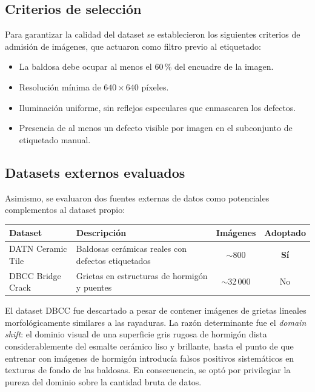 \documentclass[12pt,a4paper]{article}
\begin{document}
\subsection{Criterios de selección}

Para garantizar la calidad del dataset se establecieron los siguientes criterios de
admisión de imágenes, que actuaron como filtro previo al etiquetado:

\begin{itemize}
  \item La baldosa debe ocupar al menos el 60\,\% del encuadre de la imagen.
  \item Resolución mínima de $640\times 640$ píxeles.
  \item Iluminación uniforme, sin reflejos especulares que enmascaren los defectos.
  \item Presencia de al menos un defecto visible por imagen en el subconjunto de
        etiquetado manual.
\end{itemize}

\subsection{Datasets externos evaluados}

Asimismo, se evaluaron dos fuentes externas de datos como potenciales complementos
al dataset propio:

\begin{center}
\begin{tabularx}{\linewidth}{lXcc}
  \toprule
  \textbf{Dataset} & \textbf{Descripción} & \textbf{Imágenes} & \textbf{Adoptado} \\
  \midrule
  DATN Ceramic Tile & Baldosas cerámicas reales con defectos etiquetados & $\sim$800 & \textbf{Sí} \\
  DBCC Bridge Crack & Grietas en estructuras de hormigón y puentes & $\sim$32\,000 & No \\
  \bottomrule
\end{tabularx}
\end{center}

El dataset DBCC fue descartado a pesar de contener imágenes de grietas lineales
morfológicamente similares a las rayaduras. La razón determinante fue el \emph{domain
shift}: el dominio visual de una superficie gris rugosa de hormigón dista
considerablemente del esmalte cerámico liso y brillante, hasta el punto de que
entrenar con imágenes de hormigón introducía falsos positivos sistemáticos en
texturas de fondo de las baldosas. En consecuencia, se optó por privilegiar la
pureza del dominio sobre la cantidad bruta de datos.
\end{document}
